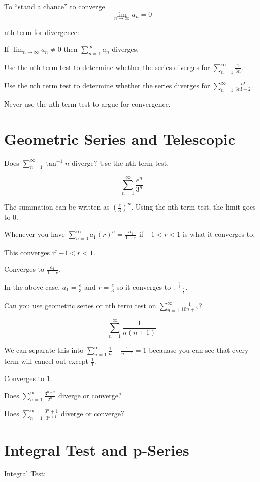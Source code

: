 \documentclass[../bccalc.tex]{subfiles}
\begin{document}
To ``stand a chance'' to converge 
\[ \lim_{n\to\infty}a_n=0\]

nth term for divergence:

If $\lim_{n\to\infty}a_n\neq 0$ then $\sum_{n=1}^{\infty}a_n$ diverges.

\ex Use the nth term test to determine whether the series diverges for $\sum_{n=1}^{\infty}\frac{1}{3n}$.

\ex Use the nth term test to determine whether the series diverges for $\sum_{n=1}^{\infty}\frac{n!}{3n!+2}$.

Never use the nth term test to argue for convergence.
\section{Geometric Series and Telescopic}
\ex Does $\sum_{n=1}^{\infty}\tan^{-1}n$ diverge? Use the nth term test.

\begin{example}
    \[ \sum_{n=1}^{\infty}\frac{e^n}{3^n}\]

    The summation can be written as $\left(\frac{e}{3}\right)^n$. Using the nth term test, the limit goes to 0.

    Whenever you have $\sum_{n=0}^{\infty}a_1(r)^n = \frac{a_1}{1-r}$ if $-1<r<1$ is what it converges to.
    
    This converges if $-1<r<1$.

    Converges to $\frac{a_1}{1-r}$.

    In the above case, $a_1=\frac{e}{3}$ and $r=\frac{e}{3}$ so it converges to $\frac{\frac{e}{3}}{1-\frac{e}{3}}$.
\end{example}

\ex Can you use geometric series or nth term test on $\sum_{n=1}^{\infty}\frac{1}{10n+7}$?

\pagebreak
\begin{example}
    \[ \sum_{n=1}^{\infty}\frac{1}{n(n+1)} \]

    We can separate this into $\sum_{n=1}^{\infty}\frac{1}{n}-\frac{1}{n+1}=1$ becauase you can see that every term will cancel out except $\frac{1}{1}$.

    Converges to 1.
\end{example}

\ex Does $\sum_{n=1}^{\infty} \frac{3^{n-2}}{2^n}$ diverge or converge?

\ex Does $\sum_{n=1}^{\infty}\frac{3^n+1}{3^{n+1}}$ diverge or converge?

\section{Integral Test and p-Series}
Integral Test:
\end{document}

